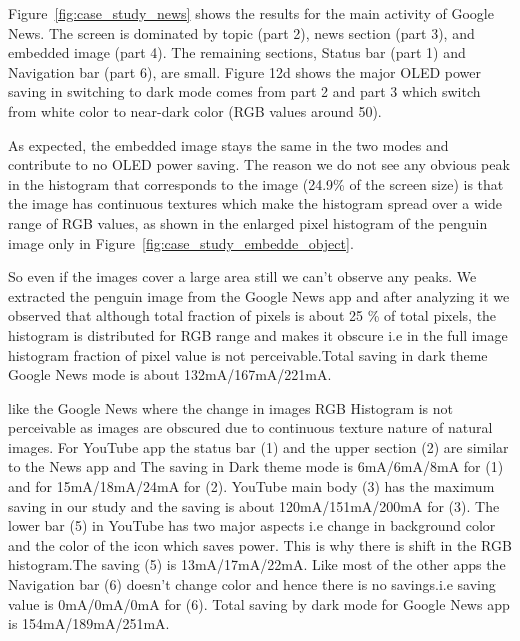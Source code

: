 Figure~\ref{fig:case_study_news} shows the results
for the main activity of Google News.  The screen is dominated by
topic (part 2), news section (part 3), and embedded image (part 4).
The remaining sections, Status bar (part 1) and Navigation bar (part
6), are small.
Figure 12d shows the major OLED power saving in switching to dark mode comes from
part 2 and part 3 which switch from white color to near-dark color
(RGB values around 50).

As expected, the embedded image stays the same
in the two modes and contribute to no OLED power saving. 
The reason we do not see any obvious peak in the histogram that corresponds to
the image (24.9\% of the screen size) is that 
the image has continuous textures which make the histogram spread over
a wide range of RGB values, as shown in the enlarged pixel histogram of
the penguin image only in Figure~\ref{fig:case_study_embedde_object}.

So even if the images cover a large area still we
can't observe any peaks. We extracted the penguin image from the Google News
app and  after analyzing it we observed that although total fraction of pixels
is about 25 \% of total pixels, the histogram is distributed for RGB range and
makes it obscure i.e in the full image histogram fraction of pixel value is not
perceivable.Total saving in dark theme Google News mode is about 132mA/167mA/221mA.
\fi


like the Google News where the change in images RGB Histogram is not
perceivable as images are obscured due to continuous texture nature of
natural images. For YouTube app the status bar (1) and the upper section (2)
are similar to the News app and The saving in Dark theme mode is
6mA/6mA/8mA for (1) and for 15mA/18mA/24mA for (2). YouTube main body (3) has
the maximum saving in our study and the saving is about 120mA/151mA/200mA for (3).
The lower bar (5) in YouTube has two major aspects i.e change in background
color and the color of the icon which saves power. This is why there is shift
in the RGB histogram.The saving (5) is  13mA/17mA/22mA. Like most of the other
apps the Navigation bar (6) doesn't change color and hence there is no
savings.i.e saving value is 0mA/0mA/0mA for (6).
Total saving by dark mode for Google News app is 154mA/189mA/251mA.
\fi

% 

